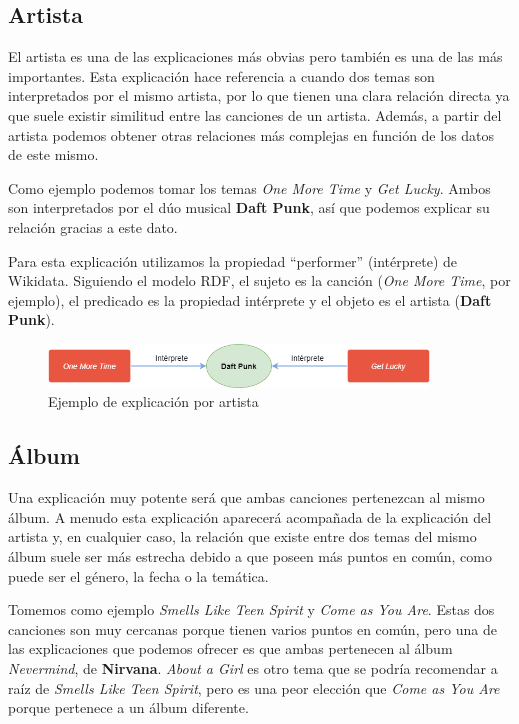 \subsection*{Artista}

El artista es una de las explicaciones más obvias pero también es una de las más importantes. Esta explicación hace referencia a cuando dos temas son interpretados por el mismo artista, por lo que tienen una clara relación directa ya que suele existir similitud entre las canciones de un artista. Además, a partir del artista podemos obtener otras relaciones más complejas en función de los datos de este mismo.

Como ejemplo podemos tomar los temas \textit{One More Time} y \textit{Get Lucky}. Ambos son interpretados por el dúo musical \textbf{Daft Punk}, así que podemos explicar su relación gracias a este dato.

Para esta explicación utilizamos la propiedad ``performer'' (intérprete) de Wikidata. Siguiendo el modelo RDF, el sujeto es la canción (\textit{One More Time}, por ejemplo), el predicado es la propiedad intérprete y el objeto es el artista (\textbf{Daft Punk}). \\

\begin{figure}[h!]
	\centering
	\includegraphics[width = 0.9\textwidth]{Imagenes/Bitmap/Artista ejemplo.png}
	\caption{Ejemplo de explicación por artista}
	\label{fig:sampleImage}
\end{figure}

\subsection*{Álbum}

Una explicación muy potente será que ambas canciones pertenezcan al mismo álbum. A menudo esta explicación aparecerá acompañada de la explicación del artista y, en cualquier caso, la relación que existe entre dos temas del mismo álbum suele ser más estrecha debido a que poseen más puntos en común, como puede ser el género, la fecha o la temática.

Tomemos como ejemplo \textit{Smells Like Teen Spirit} y \textit{Come as You Are}. Estas dos canciones son muy cercanas porque tienen varios puntos en común, pero una de las explicaciones que podemos ofrecer es que ambas pertenecen al álbum \textit{Nevermind}, de \textbf{Nirvana}. \textit{About a Girl} es otro tema que se podría recomendar a raíz de \textit{Smells Like Teen Spirit}, pero es una peor elección que \textit{Come as You Are} porque pertenece a un álbum diferente.

